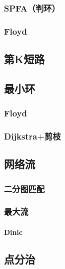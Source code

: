 \documentclass{article}
\begin{document}
\subsubsection{SPFA（判环）}

\subsubsection{Floyd}


\subsection{第K短路}


\subsection{最小环}
\subsubsection{Floyd}

\subsubsection{Dijkstra+剪枝}


\subsection{网络流}
\subsubsection{二分图匹配}

\subsubsection{最大流}
\paragraph{Dinic}


\subsection{点分治}


\end{document}
